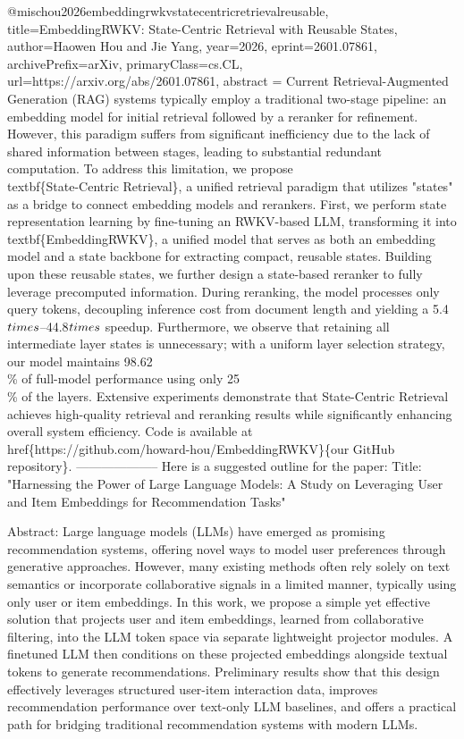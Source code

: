 {}@misc{hou2026embeddingrwkvstatecentricretrievalreusable,
      title={EmbeddingRWKV: State-Centric Retrieval with Reusable States}, 
      author={Haowen Hou and Jie Yang},
      year={2026},
      eprint={2601.07861},
      archivePrefix={arXiv},
      primaryClass={cs.CL},
      url={https://arxiv.org/abs/2601.07861},
      abstract = {Current Retrieval-Augmented Generation (RAG) systems typically employ a traditional two-stage pipeline: an embedding model for initial retrieval followed by a reranker for refinement. However, this paradigm suffers from significant inefficiency due to the lack of shared information between stages, leading to substantial redundant computation. To address this limitation, we propose \\textbf\{State-Centric Retrieval\}, a unified retrieval paradigm that utilizes "states" as a bridge to connect embedding models and rerankers. First, we perform state representation learning by fine-tuning an RWKV-based LLM, transforming it into \\textbf\{EmbeddingRWKV\}, a unified model that serves as both an embedding model and a state backbone for extracting compact, reusable states. Building upon these reusable states, we further design a state-based reranker to fully leverage precomputed information. During reranking, the model processes only query tokens, decoupling inference cost from document length and yielding a 5.4$\\times$--44.8$\\times$ speedup. Furthermore, we observe that retaining all intermediate layer states is unnecessary; with a uniform layer selection strategy, our model maintains 98.62\\\% of full-model performance using only 25\\\% of the layers. Extensive experiments demonstrate that State-Centric Retrieval achieves high-quality retrieval and reranking results while significantly enhancing overall system efficiency. Code is available at \\href\{https://github.com/howard-hou/EmbeddingRWKV\}\{our GitHub repository\}.}
}
        --------------------
         Here is a suggested outline for the paper:
Title: "Harnessing the Power of Large Language Models: A Study on Leveraging User and Item Embeddings for Recommendation Tasks"

Abstract:
Large language models (LLMs) have emerged as promising recommendation systems, offering novel ways to model user preferences through generative approaches. However, many existing methods often rely solely on text semantics or incorporate collaborative signals in a limited manner, typically using only user or item embeddings. In this work, we propose a simple yet effective solution that projects user and item embeddings, learned from collaborative filtering, into the LLM token space via separate lightweight projector modules. A finetuned LLM then conditions on these projected embeddings alongside textual tokens to generate recommendations. Preliminary results show that this design effectively leverages structured user-item interaction data, improves recommendation performance over text-only LLM baselines, and offers a practical path for bridging traditional recommendation systems with modern LLMs.

